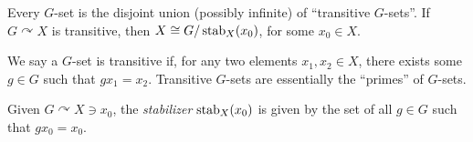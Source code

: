 \begin{theorem}
    Every $G$-set is the disjoint union (possibly infinite) of ``transitive $G$-sets''. If $G \curvearrowright X$ is transitive, then $X \cong G/\operatorname{stab}_X(x_0)$, for some $x_0 \in X$.
\end{theorem}
\begin{definition}
    We say a $G$-set is transitive if, for any two elements $x_1, x_2 \in X$, there exists some $g \in G$ such that $gx_1 = x_2$. Transitive $G$-sets are essentially the ``primes'' of $G$-sets.
\end{definition}
\begin{definition}
    Given $G \curvearrowright X \ni x_0$, the \textit{stabilizer} $\operatorname{stab}_X(x_0)$ is given by the set of all $g \in G$ such that $gx_0 = x_0$.
\end{definition}